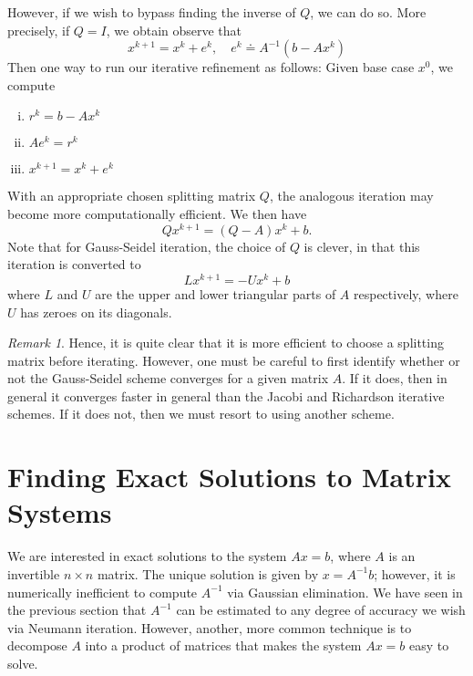 \documentclass[12pt]{article}
\theoremstyle{plain}
\theoremstyle{definition}
\theoremstyle{remark}
\newtheorem*{remark}{Remark}
\numberwithin{equation}{section}  %
\begin{document}
However, if we wish to bypass finding the inverse of $Q$, we can do so. More precisely, if
$Q = I$, we obtain
observe that
\begin{equation*}
	x^{k+1} = x^{k} + e^{k}, \quad e^{k} \doteq A^{-1}(b - Ax^{k})
\end{equation*}
Then one way to run our iterative refinement as follows: Given base case $x^{0}$, we compute 
\begin{enumerate}[i)]
\item $r^{k} = b - Ax^{k}$
\item $Ae^{k} = r^{k}$
\item $x^{k+1} = x^{k} + e^{k}$
\end{enumerate}
With an appropriate chosen splitting matrix $Q$, the analogous iteration may become
more computationally efficient. We then have
\begin{equation*}
Qx^{k+1} = (Q - A)x^{k} + b.
\end{equation*}
Note that for Gauss-Seidel iteration, the choice of $Q$ is clever, in that this
iteration  is converted to 
\begin{equation*}
L x^{k+1} = - U x^{k} + b
\end{equation*}
where $L$ and $U$ are the upper and lower triangular parts of $A$ respectively,
where $U$ has zeroes on its diagonals. 

\begin{remark}
Hence, it is quite clear that it is more efficient to choose a splitting matrix
before iterating. However, one must be careful to first identify whether or not
the Gauss-Seidel scheme converges for a given matrix $A$. If it does, then in
general it converges faster in general than the Jacobi and Richardson iterative
schemes. If it does not, then we must resort to using another scheme.
\end{remark}
\section{Finding Exact Solutions to Matrix Systems}
We are interested in exact solutions to the system $Ax = b$, 
where $A$ is an invertible $n \times n$ matrix. The unique solution
is given by $x = A^{-1}b$; however, it is numerically inefficient
to compute $A^{-1}$ via Gaussian elimination. We have seen in the previous
section that $A^{-1}$ can be estimated to any degree of accuracy we wish
via Neumann iteration. However, another, more common technique is 
to decompose $A$ into a product of matrices that makes the system $Ax = b$
easy to solve. 
\end{document}

